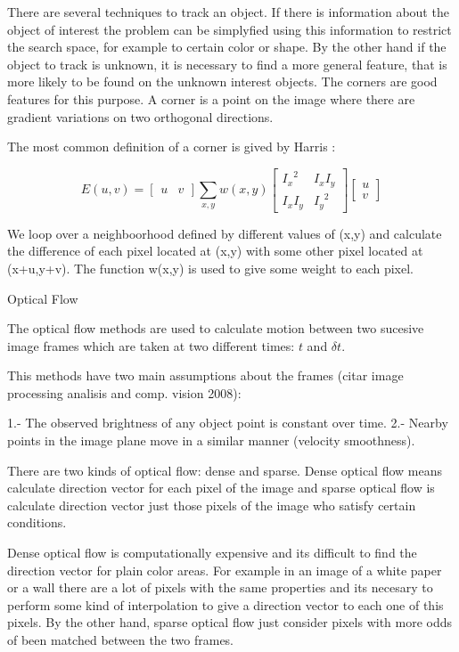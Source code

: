  


There are several techniques to track an object. If there is information about the object of interest the problem 
can be simplyfied using this information to restrict the search space, for example to certain color or shape.
 By the other hand if the object to track is unknown, it is necessary to find a more general feature, that is 
more likely to be found on the unknown interest objects. The corners are good features for this purpose. A corner 
is a point on the image where there are gradient variations on two orthogonal directions.

The most common definition of a corner is gived by Harris :

$$
E(u,v) = \begin{bmatrix} u & v \end{bmatrix} \sum\limits_{x,y} w(x,y) \begin{bmatrix} {I_x}^2 & I_x I_y \\ I_x I_y & {I_y}^2 \end{bmatrix} \begin{bmatrix} u \\ v \end{bmatrix}
$$

We loop over a neighboorhood defined by different values of (x,y) and calculate 
the difference of each pixel located at (x,y) with some other pixel located at (x+u,y+v). 
The function w(x,y) is used to give some weight to each pixel. 


Optical Flow

The optical flow methods are used to calculate motion between two sucesive image frames which are taken
 at two different times: $t$ and $\delta t$.

This methods have two main assumptions about the frames (citar image processing analisis and comp. vision 2008):

1.- The observed brightness of any object point is constant over time.
2.- Nearby points in the image plane move in a similar manner (velocity smoothness).


There are two kinds of optical flow: dense and sparse. Dense optical flow means  calculate direction vector for each pixel of the image and sparse optical flow is calculate direction vector just those pixels of the image 
who satisfy certain conditions.

Dense optical flow is computationally expensive and its difficult to find the direction vector 
for plain color areas. For example in an image of a white paper or a wall
there are a lot of pixels with the same properties and its necesary to perform some kind of interpolation to give a direction vector
 to each one of this pixels. 
By the other hand, sparse optical flow just consider pixels with more odds of been matched between the two frames.

